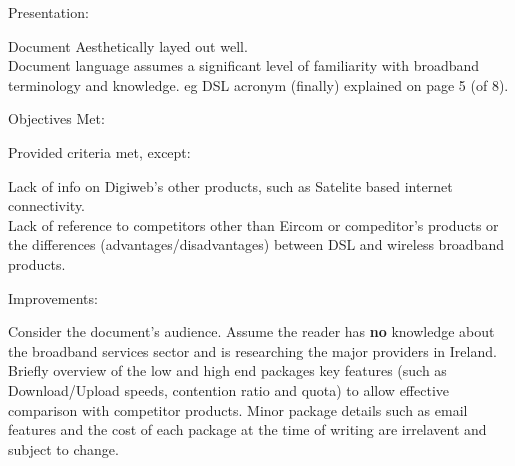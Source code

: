 \documentclass[landscape,semcolor,a4]{seminar}
\newenvironment{stitle}{\LARGE\color{darkblue}}{}
\begin{document}
\begin{slide}

\begin{stitle}
Presentation:
\end{stitle}

Document Aesthetically layed out well. \\

Document language assumes a significant level of familiarity with broadband 
terminology and knowledge. eg DSL acronym (finally) explained on page 5 (of 8).

\end{slide}

\begin{slide}

\begin{stitle}
Objectives Met:
\end{stitle}

Provided criteria met, except:

Lack of info on Digiweb's other products, such as Satelite based
internet connectivity. \\

Lack of reference to competitors other than Eircom or compeditor's
products or the differences (advantages/disadvantages) between DSL and
wireless broadband products. 

\end{slide}

\begin{slide}

\begin{stitle}
Improvements:
\end{stitle}

Consider the document's audience. Assume the reader has \textbf{no} knowledge 
about the broadband services sector and is researching the major
providers in Ireland. \\

Briefly overview of the low and high end packages key features
(such as Download/Upload speeds, contention ratio and quota) to allow
effective comparison with competitor products. Minor package details 
such as email features and the cost of each package at the time of 
writing are irrelavent and subject to change.

\end{slide}
\end{document}
